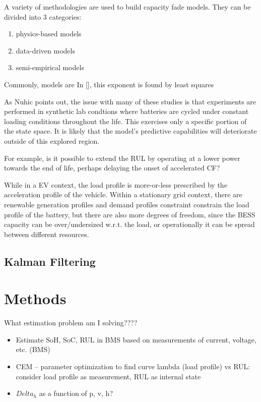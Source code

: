 A variety of methodologies are used to build capacity fade models. They can be divided into 3 categories:
\begin{enumerate}
    \item physics-based models
    \item data-driven models
    \item semi-empirical models
\end{enumerate}


Commonly, models are 
In [], this exponent is found by least squares

As Nuhic points out, the issue with many of these studies is that experiments are performed in synthetic lab condtions where batteries are cycled under constant loading conditions throughout the life. 
This exercises only a specific portion of the state space. It is likely that the model's predictive capabilities will deteriorate outside of this explored region. 

For example, is it possible to extend the RUL by operating at a lower power towards the end of life, perhaps delaying the onset of accelerated CF?

While in a EV context, the load profile is more-or-less prescribed by the acceleration profile of the vehicle. Within a stationary grid context, there are renewable generation profiles and demand profiles constraint constrain the load profile of the battery, but there are also more degrees of freedom, since the BESS capacity can be over/undersized w.r.t. the load, or operationally it can be spread between different resources.


\subsection{Kalman Filtering}


\section{Methods}






What estimation problem am I solving????
\begin{itemize}
    \item Estimate SoH, SoC, RUL in BMS based on measurements of current, voltage, etc. (BMS)
    \item CEM -- parameter optimization to find curve lambda (load profile) vs RUL: consider load profile as measurement, RUL as internal state
    \item $Delta_h$ as a function of p, v, h?
\end{itemize}


